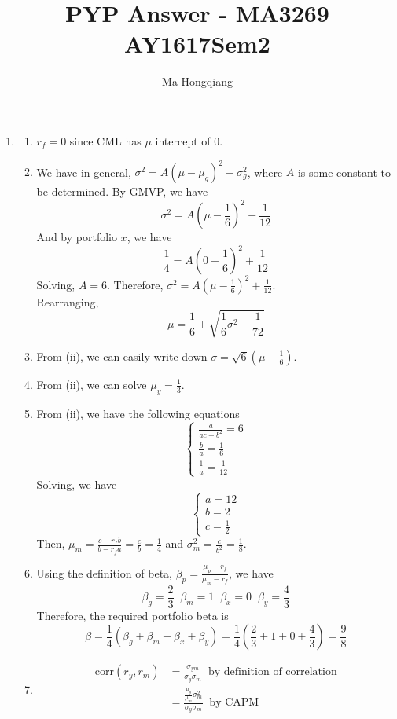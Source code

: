 \documentclass[12pt]{article}
\newcommand{\corr}{\mathrm{corr}}
\theoremstyle{definition}
\begin{document}
\title{PYP Answer - MA3269 AY1617Sem2}
\author{Ma Hongqiang}
\maketitle
\begin{enumerate}
  \item \begin{enumerate}
    \item $r_f=0$ since CML has $\mu$ intercept of $0$.
    \item We have in general, $\sigma^2=A(\mu-\mu_g)^2+\sigma_g^2$, where $A$ is some constant to be determined. By GMVP, we have
    \[
\sigma^2=A(\mu-\frac{1}{6})^2+\frac{1}{12}
    \]
    And by portfolio $x$, we have
    \[
\frac{1}{4}=A(0-\frac{1}{6})^2+\frac{1}{12}
    \]
    Solving, $A=6$.
    Therefore, $\sigma^2=A(\mu-\frac{1}{6})^2+\frac{1}{12}$.\\Rearranging,
    \[
\mu=\frac{1}{6}\pm\sqrt{\frac{1}{6}\sigma^2-\frac{1}{72}}
    \]
    \item From (ii), we can easily write down $\sigma=\sqrt{6}(\mu-\frac{1}{6})$.
    \item From (ii), we can solve $\mu_y = \frac{1}{3}$.
    \item From (ii), we have the following equations
    \[
    \begin{cases}
    \frac{a}{ac-b^2}=6\\
    \frac{b}{a}=\frac{1}{6}\\
    \frac{1}{a}=\frac{1}{12}
    \end{cases}
\]
Solving, we have
\[
\begin{cases}
a=12\\
b=2\\
c=\frac{1}{2}
\end{cases}
\]
Then, $\mu_m=\frac{c-r_fb}{b-r_fa}=\frac{c}{b}=\frac{1}{4}$ and $\sigma_m^2=\frac{c}{b^2}=\frac{1}{8}$.
\item Using the definition of beta, $\beta_p = \frac{\mu_p-r_f}{\mu_m-r_f}$, we have
\[
\beta_g = \frac{2}{3}\;\;\beta_m = 1\;\;\beta_x = 0\;\;\beta_y = \frac{4}{3}
\]
Therefore, the required portfolio beta is
\[
\beta = \frac{1}{4}(\beta_g+\beta_m+\beta_x+\beta_y)=\frac{1}{4}(\frac{2}{3}+1+0+\frac{4}{3})=\frac{9}{8}
\]
\item 
\begin{align*}
\corr(r_y, r_m)&=\frac{\sigma_{ym}}{\sigma_y\sigma_m}\;\;\text{by definition of correlation}\\
&=\frac{\frac{\mu_y}{\mu_m}\sigma_m^2}{\sigma_y\sigma_m}\;\;\text{by CAPM}\\

\end{align*}
\end{enumerate}
\end{enumerate}
\end{document}
